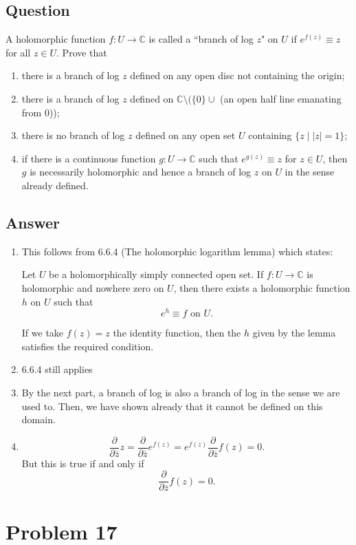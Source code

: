 \documentclass[11pt]{article}
\begin{document}
\subsection{Question}
A holomorphic function $f : U \to \mathbb{C}$ is called a  ``branch of log $z$" on $U$ if $e ^{f(z)} \equiv z$ for all $z \in U$. Prove that
\begin{enumerate}
\item there is a branch of log $z$ defined on any open disc not containing the origin;
\item there is a branch of log $z$ defined on $\mathbb{C} \setminus ( \{0\} \cup$ (an open half line emanating from 0));
\item there is no branch of log $z$ defined on any open set $U$ containing $\{z \mid |z| =1 \}$;
\item if there is a continuous function $g : U \to \mathbb{C} $ such that $e^{g(z)} \equiv z$ for $z \in U$, then $g$ is necessarily holomorphic and hence a branch of log $z$ on $U$ in the sense already defined.
\end{enumerate}
\subsection{Answer}
\begin{enumerate}
\item This follows from 6.6.4 (The holomorphic logarithm lemma) which states:

Let $U$ be a holomorphically simply connected open set. If $f: U \to \mathbb{C}$ is holomorphic and nowhere zero on $U$, then there exists a holomorphic function $h$ on $U$ such that
\[ e^h \equiv f \mbox{ on } U.\]

If we take $f(z) = z$ the identity function, then the $h$ given by the lemma satisfies the required condition. 
\item 6.6.4 still applies
\item
By the next part, a branch of log is also a branch of log in the sense we are used to. Then, we have shown already that it cannot be defined on this domain.
\item 
\[\frac{\partial}{\partial \overline{z}} z  = \frac{\partial}{\partial \overline{z}}  e^{f(z)} = e^{f(z)}  \frac{\partial}{\partial \overline{z}} f(z) = 0.\]
But this is true if and only if 
\[\frac{\partial}{\partial \overline{z}} f(z) = 0.\]


\end{enumerate}

\section{Problem 17}
\end{document}
